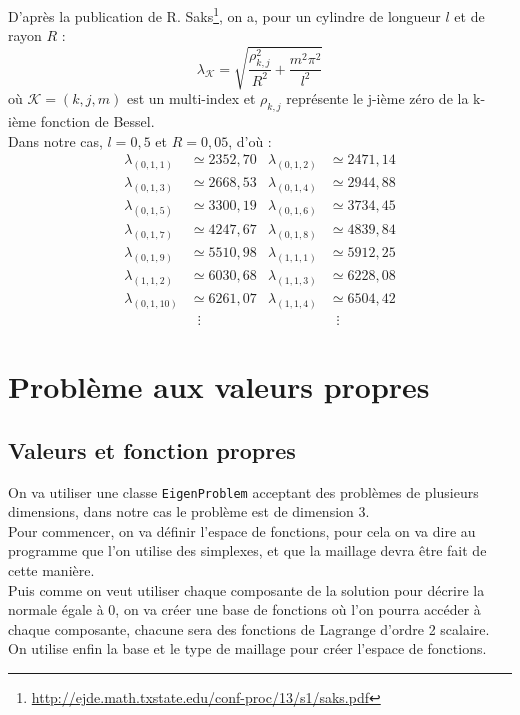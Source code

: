 D'après la publication de R. Saks\footnote{\url{http://ejde.math.txstate.edu/conf-proc/13/s1/saks.pdf}}, on a, pour un cylindre de longueur $l$ et de rayon $R$ :
\[
\lambda_\mathcal{K} = \sqrt{\frac{\rho_{k,j}^2}{R^2} + \frac{m^2\pi^2}{l^2}}
\]
où $\mathcal{K}=(k,j,m)$ est un multi-index et $\rho_{k,j}$ représente le j-ième zéro de la k-ième fonction de Bessel.\\
Dans notre cas, $l=0,5$ et $R=0,05$, d'où :
\begin{align*}
\lambda_{(0,1,1)} &\simeq 2352,70 & \lambda_{(0,1,2)} &\simeq 2471,14\\
\lambda_{(0,1,3)} &\simeq 2668,53 & \lambda_{(0,1,4)} &\simeq 2944,88\\
\lambda_{(0,1,5)} &\simeq 3300,19 & \lambda_{(0,1,6)} &\simeq 3734,45\\
\lambda_{(0,1,7)} &\simeq 4247,67 & \lambda_{(0,1,8)} &\simeq 4839,84\\
\lambda_{(0,1,9)} &\simeq 5510,98 & \lambda_{(1,1,1)} &\simeq 5912,25\\
\lambda_{(1,1,2)} &\simeq 6030,68 & \lambda_{(1,1,3)} &\simeq 6228,08\\
\lambda_{(0,1,10)} &\simeq 6261,07 & \lambda_{(1,1,4)} &\simeq 6504,42\\
&\;\;\vdots & &\;\;\vdots
\end{align*}

\section{Problème aux valeurs propres}
\subsection{Valeurs et fonction propres}

On va utiliser une classe \texttt{EigenProblem} acceptant des problèmes de plusieurs dimensions, dans notre cas le problème est de dimension 3.\\
Pour commencer, on va définir l'espace de fonctions, pour cela on va dire au programme que l'on utilise des simplexes, et que la maillage devra être fait de cette manière.\\
Puis comme on veut utiliser chaque composante de la solution pour décrire la normale égale à 0, on va créer une base de fonctions où l'on pourra accéder à chaque composante, chacune sera des fonctions de Lagrange d'ordre 2 scalaire.\\
On utilise enfin la base et le type de maillage pour créer l'espace de fonctions.

